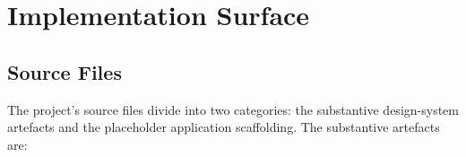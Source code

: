 
\section{Implementation Surface}
\label{sec:experiments-visualizer-nextjs-impl}

\subsection{Source Files}
\label{sec:experiments-visualizer-nextjs-impl-sources}

The project's source files divide into two categories: the substantive design-system artefacts
and the placeholder application scaffolding. The substantive artefacts are:

